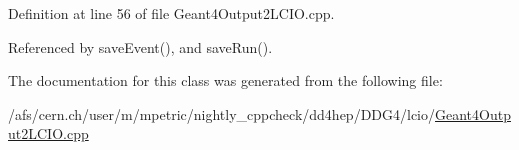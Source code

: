 Definition at line 56 of file Geant4Output2LCIO.cpp.

Referenced by saveEvent(), and saveRun().

The documentation for this class was generated from the following file:\begin{DoxyCompactItemize}
\item 
/afs/cern.ch/user/m/mpetric/nightly\_\-cppcheck/dd4hep/DDG4/lcio/\hyperlink{_geant4_output2_l_c_i_o_8cpp}{Geant4Output2LCIO.cpp}\end{DoxyCompactItemize}
